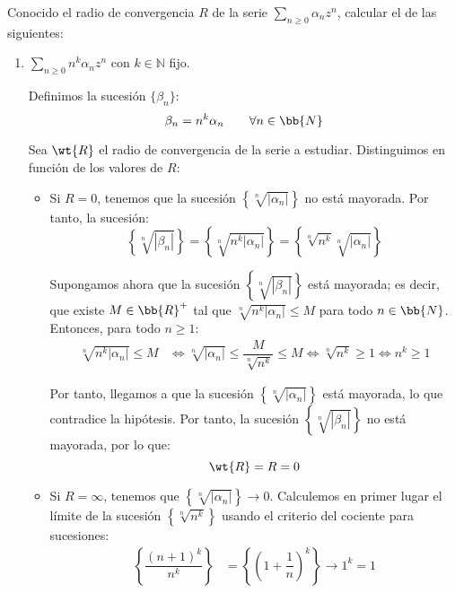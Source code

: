 \begin{ejercicio}
    Conocido el radio de convergencia $R$ de la serie $\displaystyle \sum_{n \geq 0} \alpha_nz^n$, calcular el de las siguientes:
    \begin{enumerate}
        \item $\displaystyle \sum_{n \geq 0} n^k\alpha_nz^n$ con $k \in \mathbb{N}$ fijo.
        
        Definimos la sucesión $\{\beta_n\}$:
        \[
            \beta_n = n^k\alpha_n\qquad \forall n\in \bb{N}
        \]

        Sea $\wt{R}$ el radio de convergencia de la serie a estudiar. Distinguimos en función de los valores de $R$:
        \begin{itemize}
            \item Si $R=0$, tenemos que la sucesión $\left\{\sqrt[n]{|\alpha_n|}\right\}$ no está mayorada. Por tanto, la sucesión:
            \begin{equation*}
                \left\{\sqrt[n]{|\beta_n|}\right\} = \left\{\sqrt[n]{n^k|\alpha_n|}\right\}
                = \left\{\sqrt[n]{n^k}\sqrt[n]{|\alpha_n|}\right\}
            \end{equation*}

            Supongamos ahora que la sucesión $\left\{\sqrt[n]{|\beta_n|}\right\}$ está mayorada; es decir, que existe $M\in \bb{R}^+$ tal que $\sqrt[n]{n^k|\alpha_n|}\leq M$ para todo $n\in \bb{N}$. Entonces, para todo $n\geq 1$:
            \begin{align*}
                \sqrt[n]{n^k|\alpha_n|}\leq M &\iff \sqrt[n]{|\alpha_n|}\leq \dfrac{M}{\sqrt[n]{n^k}}\leq M\iff \sqrt[n]{n^k}\geq 1\iff n^k\geq 1
            \end{align*}

            Por tanto, llegamos a que la sucesión $\left\{\sqrt[n]{|\alpha_n|}\right\}$ está mayorada, lo que contradice la hipótesis. Por tanto, la sucesión $\left\{\sqrt[n]{|\beta_n|}\right\}$ no está mayorada, por lo que:
            \begin{equation*}
                \wt{R} = R=0
            \end{equation*}

            \item Si $R=\infty$, tenemos que $\left\{\sqrt[n]{|\alpha_n|}\right\}\to 0$. Calculemos en primer lugar el límite de la sucesión $\left\{\sqrt[n]{n^k}\right\}$ usando el criterio del cociente para sucesiones:
            \begin{align*}
                \left\{\dfrac{(n+1)^k}{n^k}\right\} &= \left\{\left(1+\dfrac{1}{n}\right)^k\right\}\to 1^k = 1
            \end{align*}


\end{itemize}
\end{enumerate}
\end{ejercicio}

